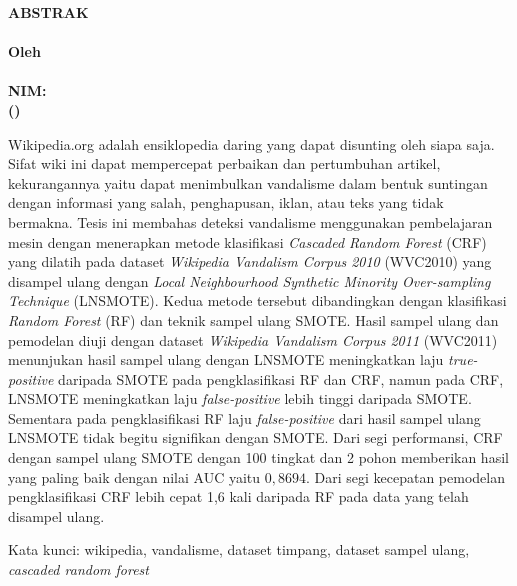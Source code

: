 \begin{center}
\textbf{\large
	ABSTRAK \\
	\bigskip
	\MakeUppercase{\mytitle{}} \\
	\bigskip
	\textnormal{Oleh} \\
	\myname{} \\
	NIM: \mysid{} \\
	(\mydept{}) \\
}
\end{center}

\bigskip
\bigskip
\bigskip

Wikipedia.org adalah ensiklopedia daring yang dapat disunting oleh siapa saja.
Sifat wiki ini dapat mempercepat perbaikan dan pertumbuhan artikel,
kekurangannya yaitu dapat menimbulkan vandalisme dalam bentuk suntingan dengan
informasi yang salah, penghapusan, iklan, atau teks yang tidak bermakna.
Tesis ini membahas deteksi vandalisme menggunakan pembelajaran mesin
dengan menerapkan metode klasifikasi
\textit{Cascaded Random Forest} (CRF)
yang dilatih pada dataset
\textit{Wikipedia Vandalism Corpus 2010} (WVC2010)
yang
disampel ulang dengan
\textit{Local Neighbourhood Synthetic Minority Over-sampling Technique}
(LNSMOTE).
Kedua metode tersebut dibandingkan dengan klasifikasi
\textit{Random Forest} (RF)
dan teknik sampel ulang SMOTE.
Hasil sampel ulang dan pemodelan diuji dengan dataset
\textit{Wikipedia Vandalism Corpus 2011} (WVC2011)
menunjukan hasil sampel ulang dengan LNSMOTE meningkatkan laju
\textit{true-positive} daripada SMOTE pada pengklasifikasi RF dan CRF, namun
pada CRF, LNSMOTE meningkatkan laju \textit{false-positive} lebih tinggi
daripada SMOTE.
Sementara pada pengklasifikasi RF laju \textit{false-positive} dari hasil
sampel ulang LNSMOTE tidak begitu signifikan dengan SMOTE.
Dari segi performansi, CRF dengan sampel ulang SMOTE dengan 100 tingkat dan 2
pohon memberikan hasil yang paling baik dengan nilai AUC yaitu $0,8694$.
Dari segi kecepatan pemodelan pengklasifikasi CRF lebih cepat 1,6 kali daripada
RF pada data yang telah disampel ulang.


Kata kunci: wikipedia, vandalisme, dataset timpang, dataset sampel ulang,
\textit{cascaded random forest}
